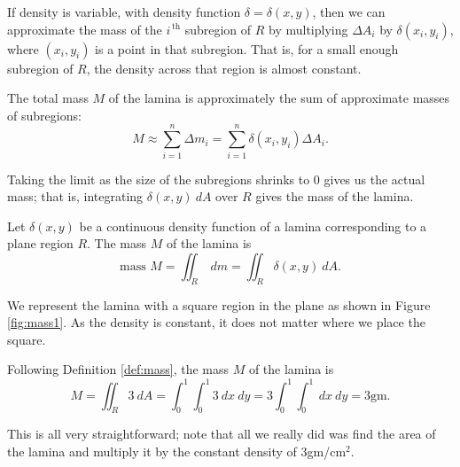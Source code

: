 If density is variable, with density function $\delta= \delta(x,y)$, then we can approximate the mass of the $i^{\,\text{th}}$ subregion of $R$ by multiplying $\Delta A_i$ by $\delta(x_i,y_i)$, where $(x_i,y_i)$ is a point in that subregion. That is, for a small enough subregion of $R$, the density across that region is almost constant. 


The total mass $M$ of the lamina is approximately the sum of approximate masses of subregions:
$$M \approx \sum_{i=1}^n \Delta m_i = \sum_{i=1}^n \delta(x_i,y_i)\Delta A_i.$$

Taking the limit as the size of the subregions shrinks to 0 gives us the actual mass; that is, integrating $\delta(x,y)\ dA$ over $R$ gives the mass of the lamina.

{Let $\delta(x,y)$ be a continuous density function of a lamina corresponding to a plane region $R$. The mass $M$ of the lamina is
$$\text{mass } M = \iint_R\ dm = \iint_R \delta(x,y)\ dA.$$
}

{We represent the lamina with a square region in the plane as shown in Figure \ref{fig:mass1}. As the density is constant, it does not matter where we place the square.

Following Definition \ref{def:mass}, the mass $M$ of the lamina is
$$M = \iint_R 3\ dA = \int_0^1\int_0^1 3\ dx\ dy = 3\int_0^1\int_0^1 \ dx\ dy=3\text{gm}.$$

This is all very straightforward; note that all we really did was find the area of the lamina and multiply it by the constant density of 3gm/cm$^2$.
}\\


